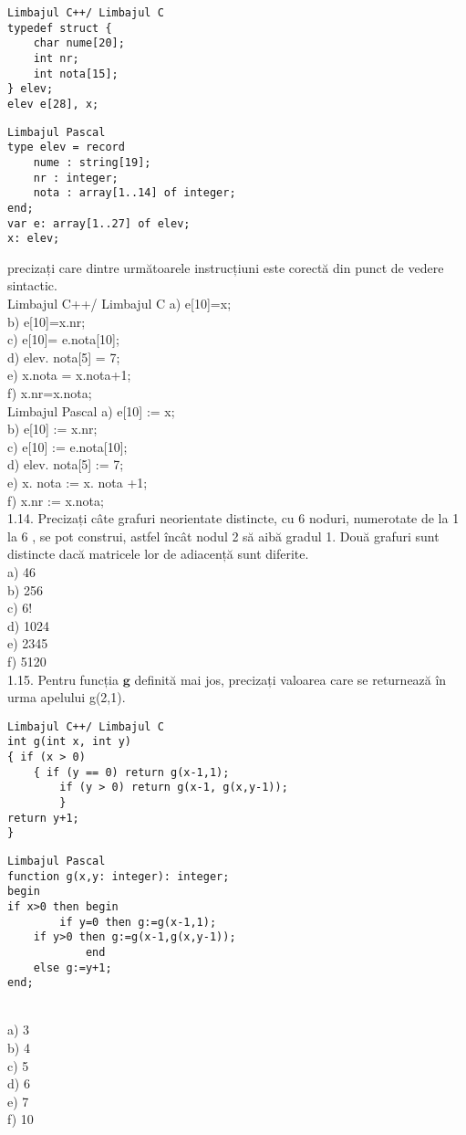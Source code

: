 \begin{verbatim}
Limbajul C++/ Limbajul C
typedef struct {
    char nume[20];
    int nr;
    int nota[15];
} elev;
elev e[28], x;
\end{verbatim}
\begin{verbatim}
Limbajul Pascal
type elev = record
    nume : string[19];
    nr : integer;
    nota : array[1..14] of integer;
end;
var e: array[1..27] of elev;
x: elev;
\end{verbatim}
precizați care dintre următoarele instrucțiuni este corectă din punct de vedere sintactic.
\\
Limbajul C++/ Limbajul C
a) e[10]=x;
\\
b) e[10]=x.nr;
\\
c) e[10]= e.nota[10];
\\
d) elev. nota[5] = 7;
\\
e) x.nota = x.nota+1;
\\
f) x.nr=x.nota;
\\
Limbajul Pascal
a) e[10] := x;
\\
b) e[10] := x.nr;
\\
c) e[10] := e.nota[10];
\\
d) elev. nota[5] := 7;
\\
e) x. nota := x. nota +1;
\\
f) x.nr := x.nota;
\\
1.14. Precizați câte grafuri neorientate distincte, cu 6 noduri, numerotate de la 1 la 6 , se pot construi, astfel încât nodul 2 să aibă gradul 1. Două grafuri sunt distincte dacă matricele lor de adiacență sunt diferite.
\\
a) 46
\\
b) 256
\\
c) $6!$
\\
d) 1024
\\
e) 2345
\\
f) 5120
\\
1.15. Pentru funcția $\mathbf{g}$ definită mai jos, precizați valoarea care se returnează în urma apelului g(2,1).
\begin{verbatim}
Limbajul C++/ Limbajul C
int g(int x, int y)
{ if (x > 0)
    { if (y == 0) return g(x-1,1);
        if (y > 0) return g(x-1, g(x,y-1));
        }
return y+1;
}
\end{verbatim}
\begin{verbatim}
Limbajul Pascal
function g(x,y: integer): integer;
begin
if x>0 then begin
        if y=0 then g:=g(x-1,1);
    if y>0 then g:=g(x-1,g(x,y-1));
            end
    else g:=y+1;
end;
\end{verbatim}
\\
a) 3
\\
b) 4
\\
c) 5
\\
d) 6
\\
e) 7
\\
f) 10
\\

